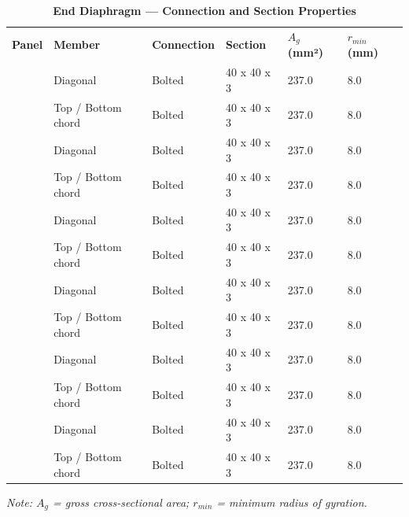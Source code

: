 \documentclass[12pt,a4paper]{report}
\numberwithin{table}{chapter}
\numberwithin{figure}{chapter}
\begin{document}
\begin{longtable}{|C{2.0cm}|L{2.0cm}|L{2.2cm}|C{2.5cm}|C{2.0cm}|C{2.0cm}|}
\caption{\textbf{End Diaphragm --- Connection and Section Properties}} \\
\hline
\endfirsthead
\hline
\caption{\textbf{End Diaphragm --- Connection and Section Properties}} \\
\hline
\endhead
\textbf{Panel} & \textbf{Member} & \textbf{Connection} & \textbf{Section} & \textbf{$A_g$ (mm²)} & \textbf{$r_{min}$ (mm)} \\[6pt]
\hline
{} & Diagonal & Bolted & 40 x 40 x 3 & 237.0 & 8.0 \\[6pt]
 & Top / Bottom chord & Bolted & 40 x 40 x 3 & 237.0 & 8.0 \\[6pt]
\hline
{} & Diagonal & Bolted & 40 x 40 x 3 & 237.0 & 8.0 \\[6pt]
 & Top / Bottom chord & Bolted & 40 x 40 x 3 & 237.0 & 8.0 \\[6pt]
\hline
{} & Diagonal & Bolted & 40 x 40 x 3 & 237.0 & 8.0 \\[6pt]
 & Top / Bottom chord & Bolted & 40 x 40 x 3 & 237.0 & 8.0 \\[6pt]
\hline
{} & Diagonal & Bolted & 40 x 40 x 3 & 237.0 & 8.0 \\[6pt]
 & Top / Bottom chord & Bolted & 40 x 40 x 3 & 237.0 & 8.0 \\[6pt]
\hline
{} & Diagonal & Bolted & 40 x 40 x 3 & 237.0 & 8.0 \\[6pt]
 & Top / Bottom chord & Bolted & 40 x 40 x 3 & 237.0 & 8.0 \\[6pt]
\hline
{} & Diagonal & Bolted & 40 x 40 x 3 & 237.0 & 8.0 \\[6pt]
 & Top / Bottom chord & Bolted & 40 x 40 x 3 & 237.0 & 8.0 \\[6pt]
\hline
\end{longtable}
\noindent\textit{Note: $A_g$ = gross cross-sectional area; $r_{min}$ = minimum radius of gyration.}
\end{document}
